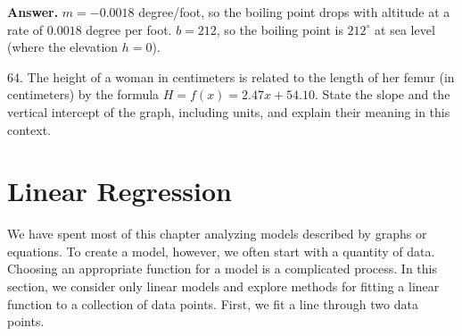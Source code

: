 \documentclass[10pt,]{book}
\theoremstyle{plain}
\theoremstyle{definition}
\theoremstyle{definition}
\theoremstyle{definition}
\theoremstyle{definition}
\numberwithin{equation}{part}
\newcommand\degree[0]{^{\circ}}
\begin{document}
\begin{exerciselist}
\par\smallskip
\par\smallskip
\noindent\textbf{Answer.}\hypertarget{answer-195}{}\quad
\(m = -0.0018\) degree/foot, so the boiling point drops with altitude at a rate of \(0.0018\) degree per foot. \(b = 212\), so the boiling point is \(212\degree\) at sea level (where the elevation \(h = 0\)).%
\item[64.]\hypertarget{exercise-350}{}The height of a woman in centimeters is related to the length of her femur (in centimeters) by the formula \(H = f (x) = 2.47x + 54.10\). State the slope and the vertical intercept of the graph, including units, and explain their meaning in this context.%
\par\smallskip
\end{exerciselist}
\typeout{************************************************}
\typeout{************************************************}
\section[{Linear Regression}]{Linear Regression}\label{linear-regression}
We have spent most of this chapter analyzing models described by graphs or equations. To create a model, however, we often start with a quantity of data. Choosing an appropriate function for a model is a complicated process. In this section, we consider only linear models and explore methods for fitting a linear function to a collection of data points. First, we fit a line through two data points.%
\typeout{************************************************}
\typeout{************************************************}
\end{document}
